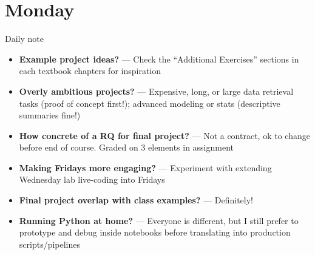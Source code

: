 \documentclass[9pt,aspectratio=169]{beamer}
\begin{document}
\section{Monday}


\begin{frame}{Daily note}
    \begin{itemize}\small 
        \item \textbf{Example project ideas?} --- Check the ``Additional Exercises'' sections in each textbook chapters for inspiration
        \item \textbf{Overly ambitious projects?} --- Expensive, long, or large data retrieval tasks (proof of concept first!); advanced modeling or stats (descriptive summaries fine!)
        \item \textbf{How concrete of a RQ for final project?} --- Not a contract, ok to change before end of course. Graded on 3 elements in assignment
        \item \textbf{Making Fridays more engaging?} --- Experiment with extending Wednesday lab live-coding into Fridays
        \item \textbf{Final project overlap with class examples?} --- Definitely!
        \item \textbf{Running Python at home?} --- Everyone is different, but I still prefer to prototype and debug inside notebooks before translating into production scripts/pipelines
    \end{itemize}
\end{frame}
\end{document}
